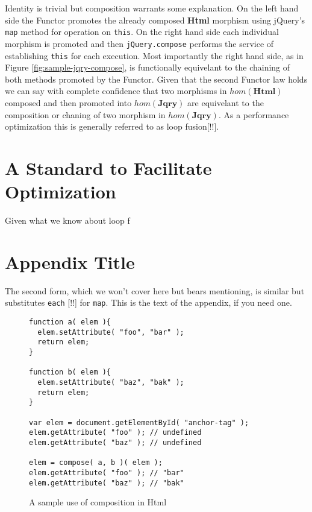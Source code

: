 \documentclass[preprint,10pt]{sigplanconf}
\begin{document}
Identity is trivial but composition warrants some explanation. On the left hand side the Functor promotes the already composed \textbf{Html} morphism using jQuery's \verb|map| method for operation on \verb|this|. On the right hand side each individual morphism is promoted and then \verb|jQuery.compose| performs the service of establishing \verb|this| for each execution. Most importantly the right hand side, as in Figure \ref{fig:sample-jqry-compose}, is functionally equivelant to the chaining of both methods promoted by the Functor. Given that the second Functor law holds we can say with complete confidence that two morphisms in \begin{math}hom(\mathbf{Html})\end{math} composed and then promoted into \begin{math}hom(\mathbf{Jqry})\end{math} are equivelant to the composition or chaning of two morphism in \begin{math}hom(\mathbf{Jqry})\end{math}. As a performance optimization this is generally referred to as loop fusion[!!].

\section{A Standard to Facilitate Optimization}

Given what we know about loop f

\appendix
\section{Appendix Title}

The second form, which we won't cover here but bears mentioning, is similar but substitutes \verb|each| [!!] for \verb|map|.
This is the text of the appendix, if you need one.

\begin{figure}[h!]
\small
\begin{verbatim}
function a( elem ){
  elem.setAttribute( "foo", "bar" );
  return elem;
}

function b( elem ){
  elem.setAttribute( "baz", "bak" );
  return elem;
}

var elem = document.getElementById( "anchor-tag" );
elem.getAttribute( "foo" ); // undefined
elem.getAttribute( "baz" ); // undefined

elem = compose( a, b )( elem );
elem.getAttribute( "foo" ); // "bar"
elem.getAttribute( "baz" ); // "bak"
\end{verbatim}
\nocaptionrule \caption{A sample use of composition in Html}
\end{figure}
\end{document}
